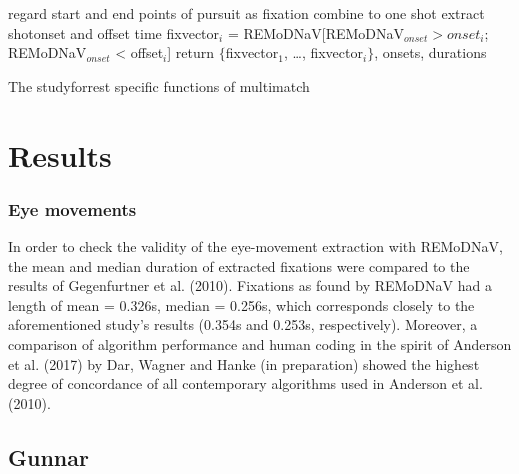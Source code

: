 \documentclass[a4paper, 11pt]{scrreprt}
\begin{document}
\begin{algorithm}
	
	{
		{
			regard start and end points of pursuit as fixation
		}
	}
	{
	}
	{
		{combine to one shot}
	}
	{
		{extract shotonset and offset time}
	}
	{fixvector$_i$ = REMoDNaV[REMoDNaV$_{onset} > onset_i$; REMoDNaV$_{onset}$ < offset$_i$]
	}
	return $\{$fixvector$_1$, \ldots, fixvector$_i$$\}$, onsets, durations
	\caption{The studyforrest specific functions of multimatch}
	\label{algo:multimatch_forrest}
\end{algorithm}






\chapter{Results}

\subsection{Eye movements}
In order to check the validity of the eye-movement extraction with REMoDNaV, the mean and median duration of extracted fixations were compared to the results of Gegenfurtner et al. (2010). Fixations as found by REMoDNaV had a length of mean = 0.326s, median = 0.256s, which corresponds closely to the aforementioned study's results (0.354s and 0.253s, respectively). Moreover, a comparison of algorithm performance and human coding in the spirit of Anderson et al. (2017) by Dar, Wagner and Hanke (in preparation) showed the highest degree of concordance of all contemporary algorithms used in Anderson et al. (2010).

\bigskip





\section{Gunnar}
\end{document}
